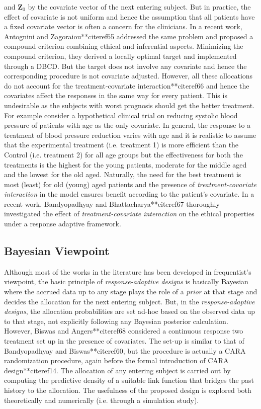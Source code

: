 and ${\mathbf{Z}}_{0}$ by the covariate vector of the next entering subject. But in practice, the effect of covariate is not uniform and hence  the assumption that all patients have a fixed covariate vector is often a concern for the clinicians. In a recent work, Antognini and Zagoraiou**citeref{65} addressed the same problem and proposed a compound criterion combining ethical and inferential aspects. Minimizing the compound criterion, they derived a locally optimal target and implemented through a DBCD. But the target does not involve any covariate  and hence the corresponding procedure is not covariate adjusted.  However, all these allocations do not account for the treatment-covariate interaction**citeref{66} and hence the covariates affect the responses in the same way for every patient. This is undesirable as the subjects with worst prognosis should get the better treatment. For example consider a hypothetical clinical trial on reducing systolic blood pressure of patients with age  as the only covariate. In general,  the response to a treatment of blood pressure reduction varies with age and it is realistic to assume that the experimental treatment (i.e. treatment 1) is more efficient than the Control (i.e. treatment 2) for all age groups but the effectiveness for both the treatments is the highest for the young patients, moderate for the middle aged and the lowest for the old aged. Naturally, the need for the best treatment is most (least) for  old (young) aged patients and the presence of \textit{treatment-covariate interaction} in the model ensures  benefit according to the patient's covariate. In a recent work, Bandyopadhyay and Bhattacharya**citeref{67} thoroughly investigated the effect of \textit{treatment-covariate interaction} on the ethical properties under a response adaptive framework.

\subsection{Bayesian Viewpoint}

Although most of the works in the literature has been developed in frequentist's viewpoint, the basic principle of \textit{response-adaptive designs} is basically Bayesian where the accrued data up to any stage plays the
role of a \textit{prior} at that stage and decides the allocation for the next
entering subject. But, in the \textit{response-adaptive designs}, the allocation probabilities are set ad-hoc based on the observed data up to that stage, not explicitly following any Bayesian posterior calculation. However, Biswas and Angers**citeref{68} considered a continuous response two treatment set up in the presence of covariates. The set-up is similar to that of Bandyopadhyay and Biswas**citeref{60}, but the procedure is actually a CARA randomization procedure, again before the formal introduction of CARA design**citeref{14}.
The allocation of any entering subject is carried out by computing
the predictive density of a suitable link function that bridges the
past history to the allocation. The usefulness of the proposed design is explored both theoretically and numerically (i.e. through a simulation study).


